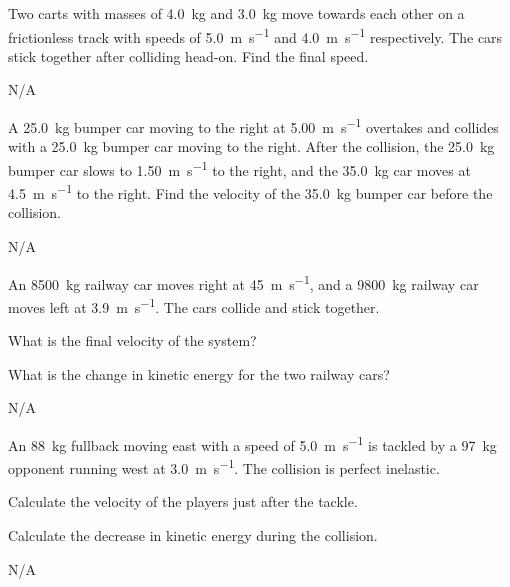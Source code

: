 \begin{question}[ID=impulse-B-Q01,topic=impulse,difficulty=B]
    Two carts with masses of \SI{4.0}{\kilo\gram} and 
        \SI{3.0}{\kilo\gram} move towards each other on
        a frictionless track with speeds of
        \SI{5.0}{\meter\per\second} and
        \SI{4.0}{\meter\per\second} respectively.
    The cars stick together after colliding head-on.
    Find the final speed.
\end{question}
\begin{solution}
    N/A
\end{solution}


\begin{question}[ID=impulse-B-Q02,topic=impulse,difficulty=B]
    A \SI{25.0}{\kilo\gram} bumper car moving to the right
        at \SI{5.00}{\meter\per\second} overtakes and collides
        with a \SI{25.0}{\kilo\gram} bumper car moving to the
        right.
    After the collision, the \SI{25.0}{\kilo\gram} bumper
        car slows to \SI{1.50}{\meter\per\second} to
        the right, and the \SI{35.0}{\kilo\gram} car
        moves at \SI{4.5}{\meter\per\second} to the right.
    Find the velocity of the \SI{35.0}{\kilo\gram} bumper
        car before the collision.
\end{question}
\begin{solution}
    N/A
\end{solution}


\begin{question}[ID=impulse-B-Q03,topic=impulse,difficulty=B]
    An \SI{8500}{\kilo\gram} railway car moves right at
        \SI{45}{\meter\per\second}, and a \SI{9800}{\kilo\gram}
        railway car moves left at \SI{3.9}{\meter\per\second}.
    The cars collide and stick together.
    \begin{enumerate*}[label=\arabic*)]
        \item What is the final velocity of the system?
        \item What is the change in kinetic energy for the two railway cars?
    \end{enumerate*}
\end{question}
\begin{solution}
    N/A
\end{solution}


\begin{question}[ID=impulse-B-Q04,topic=impulse,difficulty=B]
    An \SI{88}{\kilo\gram} fullback moving east with a speed
        of \SI{5.0}{\meter\per\second} is tackled by a
        \SI{97}{\kilo\gram} opponent running west at
        \SI{3.0}{\meter\per\second}.
    The collision is perfect inelastic.
    \begin{enumerate*}[label=\arabic*)]
        \item Calculate the velocity of the players just after the tackle.
        \item Calculate the decrease in kinetic energy during the collision.
    \end{enumerate*}
\end{question}
\begin{solution}
    N/A
\end{solution}


